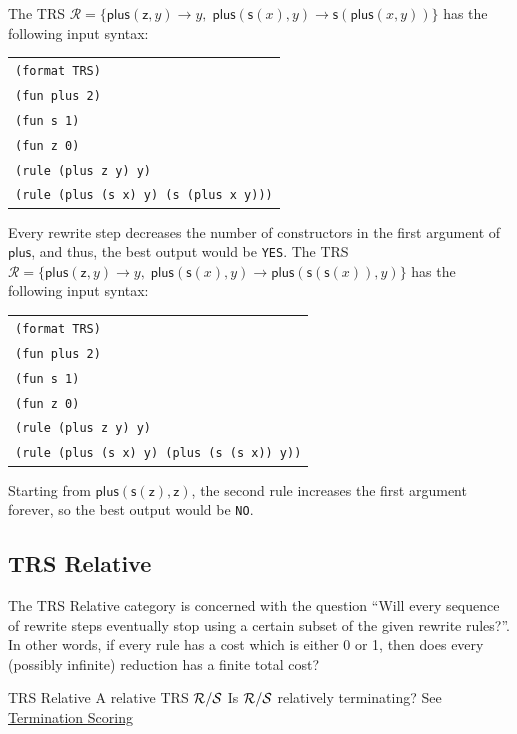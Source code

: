 \begin{example}
The TRS $\mathcal{R} = \{\mathsf{plus}(\mathsf{z}, y) \to y,\; \mathsf{plus}(\mathsf{s}(x), y) \to \mathsf{s}(\mathsf{plus}(x,y))\}$
has the following input syntax:
\begin{center}
\begin{tabular}{l}
\texttt{(format TRS)} \\
\texttt{(fun plus 2)} \\
\texttt{(fun s 1)} \\
\texttt{(fun z 0)} \\
\texttt{(rule (plus z y) y)} \\
\texttt{(rule (plus (s x) y) (s (plus x y)))}
\end{tabular}
\end{center}
Every rewrite step decreases the number of constructors in the first argument of $\mathsf{plus}$, and thus, the best output would be \texttt{YES}.
The TRS $\mathcal{R} = \{\mathsf{plus}(\mathsf{z}, y) \to y,\; \mathsf{plus}(\mathsf{s}(x), y) \to \mathsf{plus}(\mathsf{s}(\mathsf{s}(x)), y)\}$
has the following input syntax:
\begin{center}
\begin{tabular}{l}
\texttt{(format TRS)} \\
\texttt{(fun plus 2)} \\
\texttt{(fun s 1)} \\
\texttt{(fun z 0)} \\
\texttt{(rule (plus z y) y)} \\
\texttt{(rule (plus (s x) y) (plus (s (s x)) y))}
\end{tabular}
\end{center}
Starting from $\mathsf{plus}(\mathsf{s}(\mathsf{z}),\mathsf{z})$, the second rule increases the first argument forever, so the best output would be \texttt{NO}.
\end{example}

\subsection{TRS Relative}

The TRS Relative category is concerned with the question 
``Will every sequence of rewrite steps eventually stop using a certain subset of the given rewrite rules?''. 
In other words, if every rule has a cost which is either 0 or 1, then does every (possibly infinite) reduction has a finite total cost? 

\begin{formalproblem}
  {TRS Relative}
  {A relative TRS $\mathcal{R}/\mathcal{S}$}
  {Is $\mathcal{R}/\mathcal{S}$ relatively terminating?}
  {See \hyperref[scoring_termination]{Termination Scoring}}
\end{formalproblem}

